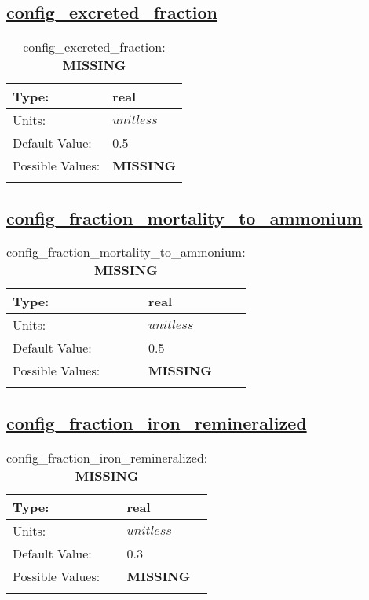 \subsection[config\_excreted\_fraction]{\hyperref[sec:nm_tab_biogeochemistry]{config\_excreted\_fraction}}
\label{subsec:nm_sec_config_excreted_fraction}
\begin{center}
\begin{longtable}{| p{2.0in} || p{4.0in} |}
    \hline
    Type: & real \\
    \hline
    Units: & $unitless$ \\
    \hline
    Default Value: & 0.5 \\
    \hline
    Possible Values: & {\bf \color{red} MISSING} \\
    \hline
    \caption{config\_excreted\_fraction: {\bf \color{red} MISSING}}
\end{longtable}
\end{center}
\subsection[config\_fraction\_mortality\_to\_ammonium]{\hyperref[sec:nm_tab_biogeochemistry]{config\_fraction\_mortality\_to\_ammonium}}
\label{subsec:nm_sec_config_fraction_mortality_to_ammonium}
\begin{center}
\begin{longtable}{| p{2.0in} || p{4.0in} |}
    \hline
    Type: & real \\
    \hline
    Units: & $unitless$ \\
    \hline
    Default Value: & 0.5 \\
    \hline
    Possible Values: & {\bf \color{red} MISSING} \\
    \hline
    \caption{config\_fraction\_mortality\_to\_ammonium: {\bf \color{red} MISSING}}
\end{longtable}
\end{center}
\subsection[config\_fraction\_iron\_remineralized]{\hyperref[sec:nm_tab_biogeochemistry]{config\_fraction\_iron\_remineralized}}
\label{subsec:nm_sec_config_fraction_iron_remineralized}
\begin{center}
\begin{longtable}{| p{2.0in} || p{4.0in} |}
    \hline
    Type: & real \\
    \hline
    Units: & $unitless$ \\
    \hline
    Default Value: & 0.3 \\
    \hline
    Possible Values: & {\bf \color{red} MISSING} \\
    \hline
    \caption{config\_fraction\_iron\_remineralized: {\bf \color{red} MISSING}}
\end{longtable}
\end{center}
